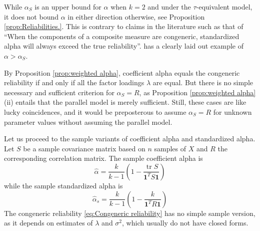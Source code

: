 \documentclass[twoside]{article}
\DeclareMathOperator{\tr}{tr}
\begin{document}
\begin{rem}
While $\alpha_S$ is an upper bound for $\alpha$ when $k = 2$ and under the $\tau$-equivalent model, it does not bound $\alpha$ in either direction otherwise, see Proposition \ref{prop:Reliabilities.}. This is contrary to claims in the literature such as that of \citet[][p.348]{Osburn2000-jd} \enquote{When the components of a composite measure are congeneric, standardized alpha will always exceed the true reliability}. \citet[][p.450]{Falk2011-ae} has a clearly laid out example of $\alpha>\alpha_S$.
\end{rem}


By Proposition \ref{prop:weighted alpha}, coefficient alpha equals the congeneric reliability if and only if all the factor loadings $\lambda$ are equal. But there is no simple necessary and sufficient criterion for $\alpha_S =  R$, as Proposition \ref{prop:weighted alpha} (ii) entails that the parallel model is merely sufficient. Still, these cases are like lucky coincidences, and it would be preposterous to assume $\alpha_S =  R$ for unknown parameter values without assuming the parallel model.

Let us proceed to the sample variants of coefficient alpha and standardized
alpha. Let $S$ be a sample covariance matrix based on
$n$ samples of $X$ and $R$ the corresponding correlation matrix.
The sample coefficient alpha is 
\begin{equation}
\hat{\alpha}=\frac{k}{k-1}\left(1-\frac{\tr{S}}{\boldsymbol{1}^{T}S\boldsymbol{1}}\right)\label{eq:sample coefficient alpha}
\end{equation}
while the sample standardized alpha is
\begin{equation}
\hat{\alpha}_s=\frac{k}{k-1}\left(1-\frac{k}{\boldsymbol{1}^{T}R\boldsymbol{1}}\right)\label{eq:sample standardized alpha}
\end{equation}
The congeneric reliability \eqref{eq:Congeneric reliability} has no
simple sample version, as it depends on estimates of $\lambda$ and
$\sigma^2$, which usually do not have closed forms.
\end{document}
